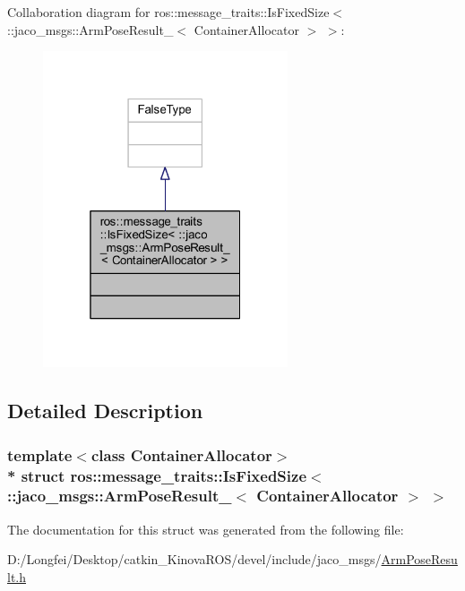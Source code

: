 Collaboration diagram for ros\+:\+:message\+\_\+traits\+:\+:Is\+Fixed\+Size$<$ \+:\+:jaco\+\_\+msgs\+:\+:Arm\+Pose\+Result\+\_\+$<$ Container\+Allocator $>$ $>$\+:
\nopagebreak
\begin{figure}[H]
\begin{center}
\leavevmode
\includegraphics[width=205pt]{d8/d3d/structros_1_1message__traits_1_1IsFixedSize_3_01_1_1jaco__msgs_1_1ArmPoseResult___3_01ContainerAllocator_01_4_01_4__coll__graph}
\end{center}
\end{figure}


\subsection{Detailed Description}
\subsubsection*{template$<$class Container\+Allocator$>$\\*
struct ros\+::message\+\_\+traits\+::\+Is\+Fixed\+Size$<$ \+::jaco\+\_\+msgs\+::\+Arm\+Pose\+Result\+\_\+$<$ Container\+Allocator $>$ $>$}



The documentation for this struct was generated from the following file\+:\begin{DoxyCompactItemize}
\item 
D\+:/\+Longfei/\+Desktop/catkin\+\_\+\+Kinova\+R\+O\+S/devel/include/jaco\+\_\+msgs/\hyperlink{ArmPoseResult_8h}{Arm\+Pose\+Result.\+h}\end{DoxyCompactItemize}
